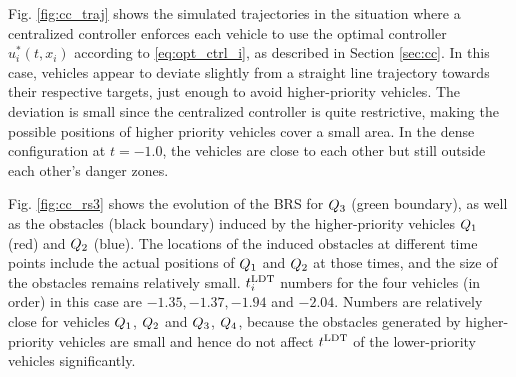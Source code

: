 Fig. \ref{fig:cc_traj} shows the simulated trajectories in the situation where a centralized controller enforces each vehicle to use the optimal controller $u^*_i(t, x_i)$ according to \eqref{eq:opt_ctrl_i}, as described in Section \ref{sec:cc}. In this case, vehicles appear to deviate slightly from a straight line trajectory towards their respective targets, just enough to avoid higher-priority vehicles. The deviation is small since the centralized controller is quite restrictive, making the possible positions of higher priority vehicles cover a small area. In the dense configuration at $t=-1.0$, the vehicles are close to each other but still outside each other's danger zones.

Fig. \ref{fig:cc_rs3} shows the evolution of the BRS for $Q_3$ (green boundary), as well as the obstacles (black boundary) induced by the higher-priority vehicles $Q_1$ (red) and $Q_2$ (blue). The locations of the induced obstacles at different time points include the actual positions of $Q_1$ and $Q_2$ at those times, and the size of the obstacles remains relatively small. $t^\text{LDT}_i$ numbers for the four vehicles (in order) in this case are $-1.35, -1.37, -1.94$ and $-2.04$. Numbers are relatively close for vehicles $Q_1$, $Q_2$ and $Q_3$, $Q_4$, because the obstacles generated by higher-priority vehicles are small and hence do not affect $t^\text{LDT}$ of the lower-priority vehicles significantly. 